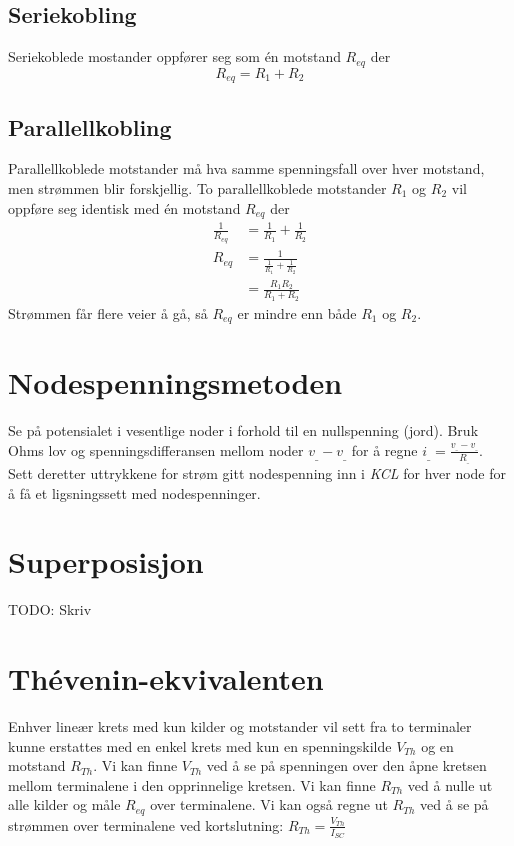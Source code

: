 \documentclass[12pt,a4paper,norsk]{article}
\newcommand{\resi}[1]{\frac{1}{#1}}
\begin{document}
\subsection{Seriekobling}
Seriekoblede mostander oppfører seg som én motstand $R_{eq}$ der
\[R_{eq} = R_{1} + R_{2}\]

\subsection{Parallellkobling}
Parallellkoblede motstander må hva samme spenningsfall over hver motstand, men
strømmen blir forskjellig. To parallellkoblede motstander $R_{1}$ og $R_{2}$ vil
oppføre seg identisk med én motstand $R_{eq}$ der
\begin{align*}
  \resi{R_{eq}} &= \resi{R_{1}} + \resi{R_{2}} \\
  R_{eq} &= \resi{\resi{R_{1}} + \resi{R_{2}}} \\
        &= \frac{R_{1}R_{2}}{R_{1} + R_{2}}
\end{align*}
Strømmen får flere veier å gå, så $R_{eq}$ er mindre enn både $R_{1}$ og $R_{2}$.

\section{Nodespenningsmetoden}
Se på potensialet i vesentlige noder i forhold til en nullspenning (jord). Bruk Ohms
lov og spenningsdifferansen mellom noder $v_{\_}-v_{\_}$ for å regne
$i_{\_} = \frac{v_{\_}-v_{\_}}{R_{\_}}$. Sett deretter uttrykkene for strøm gitt
nodespenning inn i \textit{KCL} for hver node for å få et ligsningssett med
nodespenninger.

\section{Superposisjon}
TODO\@: Skriv

\section{Thévenin-ekvivalenten}
Enhver lineær krets med kun kilder og motstander vil sett fra to terminaler
kunne erstattes med en enkel krets med kun en spenningskilde $V_{Th}$ og en
motstand $R_{Th}$.
Vi kan finne $V_{Th}$ ved å se på spenningen over den åpne kretsen mellom
terminalene i den opprinnelige kretsen.
Vi kan finne $R_{Th}$ ved å nulle ut alle kilder og måle $R_{eq}$ over
terminalene. Vi kan også regne ut $R_{Th}$ ved å se på strømmen over terminalene
ved kortslutning: $R_{Th} = \frac{V_{Th}}{I_{SC}}$
\end{document}
